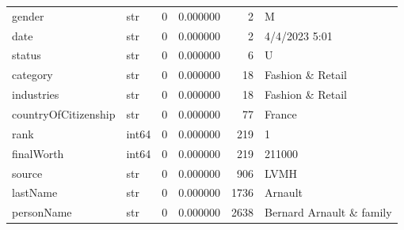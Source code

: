 \begin{tabular}{llrrrl}
gender & str & 0 & 0.000000 & 2 & M \\
date & str & 0 & 0.000000 & 2 & 4/4/2023 5:01 \\
status & str & 0 & 0.000000 & 6 & U \\
category & str & 0 & 0.000000 & 18 & Fashion \& Retail \\
industries & str & 0 & 0.000000 & 18 & Fashion \& Retail \\
countryOfCitizenship & str & 0 & 0.000000 & 77 & France \\
rank & int64 & 0 & 0.000000 & 219 & 1 \\
finalWorth & int64 & 0 & 0.000000 & 219 & 211000 \\
source & str & 0 & 0.000000 & 906 & LVMH \\
lastName & str & 0 & 0.000000 & 1736 & Arnault \\
personName & str & 0 & 0.000000 & 2638 & Bernard Arnault \& family \\
\bottomrule
\end{tabular}
